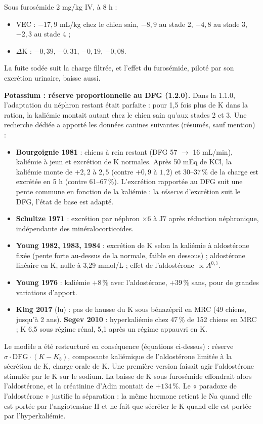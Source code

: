 \documentclass[10pt,a4paper]{article}
\begin{document}
Sous furosémide 2 mg/kg IV, à 8 h :
\begin{itemize}
\item VEC : $-17{,}9$ mL/kg chez le chien sain, $-8{,}9$ au stade 2, $-4{,}8$ au stade 3, $-2{,}3$ au stade 4 ;
\item $\Delta$K : $-0{,}39$, $-0{,}31$, $-0{,}19$, $-0{,}08$.
\end{itemize}
La fuite sodée suit la charge filtrée, et l'effet du furosémide, piloté par son excrétion urinaire, baisse aussi.

\textbf{Potassium : réserve proportionnelle au DFG (1.2.0).} Dans la 1.1.0, l'adaptation du néphron restant était parfaite : pour 1,5 fois plus de K dans la ration, la kaliémie montait autant chez le chien sain qu'aux stades 2 et 3. Une recherche dédiée a apporté les données canines suivantes (résumés, sauf mention) :
\begin{itemize}
\item \textbf{Bourgoignie 1981} : chiens à rein restant (DFG 57 $\to$ 16 mL/min), kaliémie à jeun et excrétion de K normales. Après 50 mEq de KCl, la kaliémie monte de $+2{,}2$ à $2{,}5$ (contre $+0{,}9$ à $1{,}2$) et 30–37\,\% de la charge est excrétée en 5 h (contre 61–67\,\%). L'excrétion rapportée au DFG suit une pente commune en fonction de la kaliémie : la \emph{réserve} d'excrétion suit le DFG, l'état de base est adapté.
\item \textbf{Schultze 1971} : excrétion par néphron $\times 6$ à J7 après réduction néphronique, indépendante des minéralocorticoïdes.
\item \textbf{Young 1982, 1983, 1984} : excrétion de K selon la kaliémie à aldostérone fixée (pente forte au-dessus de la normale, faible en dessous) ; aldostérone linéaire en K, nulle à 3,29 mmol/L ; effet de l'aldostérone $\propto A^{0{,}7}$.
\item \textbf{Young 1976} : kaliémie $+8$\,\% avec l'aldostérone, $+39$\,\% sans, pour de grandes variations d'apport.
\item \textbf{King 2017} (lu) : pas de hausse du K sous bénazépril en MRC (49 chiens, jusqu'à 2 ans). \textbf{Segev 2010} : hyperkaliémie chez 47\,\% de 152 chiens en MRC ; K 6,5 sous régime rénal, 5,1 après un régime appauvri en K.
\end{itemize}

Le modèle a été restructuré en conséquence (équations ci-dessus) : réserve $\sigma\cdot\mathrm{DFG}\cdot(K - K_b)$, composante kaliémique de l'aldostérone limitée à la sécrétion de K, charge orale de K. Une première version faisait agir l'aldostérone stimulée par le K sur le sodium. La baisse de K sous furosémide effondrait alors l'aldostérone, et la créatinine d'Adin montait de $+134$\,\%. Le « paradoxe de l'aldostérone » justifie la séparation : la même hormone retient le Na quand elle est portée par l'angiotensine II et ne fait que sécréter le K quand elle est portée par l'hyperkaliémie.
\end{document}
